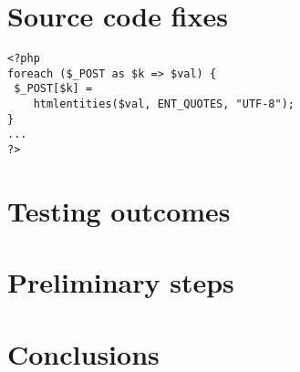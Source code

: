 \documentclass{sig-alternate-05-2015}
\begin{document}
\section{Source code fixes}\label{fixes}
\begin{lstlisting}[frame=single, caption={Fixing all the vulnerabilities in index.php}]
<?php
foreach ($_POST as $k => $val) {
 $_POST[$k] =
    htmlentities($val, ENT_QUOTES, "UTF-8");
}
...
?>
\end{lstlisting}


\section{Testing outcomes}\label{outcomes}

\section{Preliminary steps}\label{steps}

\section{Conclusions}\label{conclusions}


%

%

%
%
\end{document}
